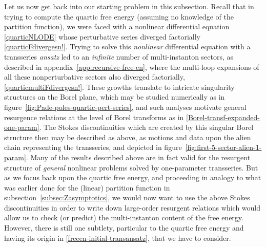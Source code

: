 \documentclass[11pt,a4paper]{article}
\begin{document}
Let us now get back into our starting problem in this subsection. Recall that in trying to compute the quartic free energy (assuming no knowledge of the partition function), we were faced with a nonlinear differential equation \eqref{quarticNLODE} whose perturbative series diverged factorially \eqref{quarticFdivergesn!}. Trying to solve this \textit{nonlinear} differential equation with a transseries \textit{ansatz} led to an \textit{infinite} number of multi-instanton sectors, as described in appendix~\ref{app:recursive-free-en}, where the multi-loop expansions of all these nonperturbative sectors also diverged factorially, \eqref{quarticmultiFdivergesn!}. These growths translate to intricate singularity structures on the Borel plane, which may be studied numerically as in figure~\ref{fig:Pade-poles-quartic-pert-series}, and such analyses motivate general resurgence relations at the level of Borel transforms as in \eqref{Borel-transf-expanded-one-param}. The Stokes discontinuities which are created by this singular Borel structure then may be described as above, as motions and data upon the alien chain representing the transseries, and depicted in figure~\ref{fig:first-5-sector-alien-1-param}. Many of the results described above are in fact valid for the resurgent structure of \textit{general} nonlinear problems solved by one-parameter transseries. But as we focus back upon the quartic free energy, and proceeding in analogy to what was earlier done for the (linear) partition function in subsection~\ref{subsec:Zasymptotics}, we would now want to use the above Stokes discontinuities in order to write down large-order resurgent relations which would allow us to check (or predict) the multi-instanton content of the free energy. However, there is still one subtlety, particular to the quartic free energy and having its origin in \eqref{freeen-initial-transansatz}, that we have to consider.
\end{document}
